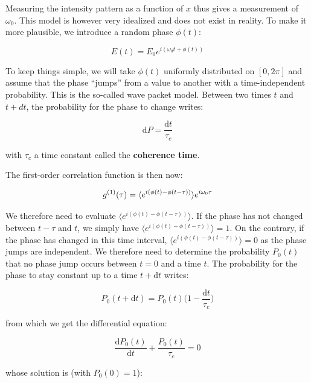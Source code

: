 \noindent Measuring the intensity pattern as a function of $x$ thus gives a measurement of $\omega_0$. This model is however very idealized and does not exist in reality. To make it more plausible, we introduce a random phase $\phi(t)$:

\begin{equation}
    E(t)=E_0 e^{i (\omega_0 t + \phi(t))}
\end{equation}

\noindent To keep things simple, we will take $\phi(t)$ uniformly distributed on $[0,2\pi]$ and assume that the phase ``jumps'' from a value to another with a time-independent probability. This is the so-called wave packet model. Between two times $t$ and $t+dt$, the probability for the phase to change writes:

\begin{equation}
    \mathrm{d}P = \frac{\mathrm{d}t}{\tau_c}
\end{equation}

\noindent with $\tau_c$ a time constant called the \textbf{coherence time}.

The first-order correlation function is then now:

\begin{equation}
    g^{(1)} (\tau) = \langle e^{i(\phi(t)-\phi(t-\tau))}\rangle e^{i \omega_0 \tau}
\end{equation}

\noindent We therefore need to evaluate $\langle e^{i(\phi(t)-\phi(t-\tau))} \rangle$. If the phase has not changed between $t-\tau$ and $t$, we simply have $\langle e^{i(\phi(t)-\phi(t-\tau))} \rangle=1$. On the contrary, if the phase has changed in this time interval, $\langle e^{i(\phi(t)-\phi(t-\tau))} \rangle=0$ as the phase jumps are independent. We therefore need to determine the probability $P_0(t)$ that no phase jump occurs between $t=0$ and a time $t$. The probability for the phase to stay constant up to a time $t+ \mathrm{d}t$ writes:


\begin{equation}
    P_0(t+\mathrm{d}t)=P_0(t)  \Big(1-\frac{\mathrm{d}t}{\tau_c} \Big)
\end{equation}

\noindent from which we get the differential equation:

\begin{equation}
    \frac{\mathrm{d}P_0(t)}{\mathrm{d}t} + \frac{P_0(t)}{\tau_c} = 0
\end{equation}

\noindent whose solution is (with $P_0(0)=1$):

